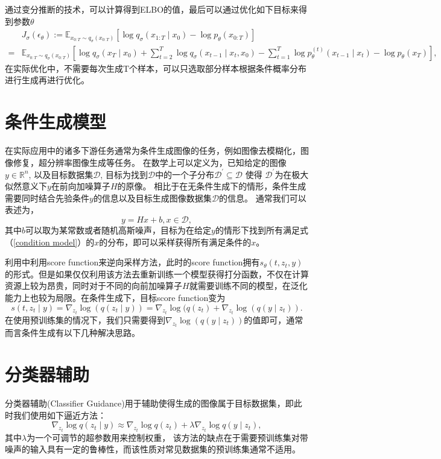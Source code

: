 通过变分推断的技术，可以计算得到ELBO的值，最后可以通过优化如下目标来得到参数$\theta$
\begin{align} & J_\sigma\left(\epsilon_\theta\right):=\mathbb{E}_{{x}_{0: T} \sim q_\sigma\left({x}_{0: T}\right)}\left[\log q_\sigma\left({x}_{1: T} \mid {x}_0\right)-\log p_\theta\left({x}_{0: T}\right)\right] \\ = & \mathbb{E}_{{x}_{0: T} \sim q_\sigma\left({x}_{0: T}\right)}\left[\log q_\sigma\left({x}_T \mid {x}_0\right)+\sum_{t=2}^T \log q_\sigma\left({x}_{t-1} \mid {x}_t, {x}_0\right)-\sum_{t=1}^T \log p_\theta^{(t)}\left({x}_{t-1} \mid {x}_t\right)-\log p_\theta\left({x}_T\right)\right],\end{align}
在实际优化中，不需要每次生成T个样本，可以只选取部分样本根据条件概率分布进行生成再进行优化。
\section{条件生成模型}
在实际应用中的诸多下游任务通常为条件生成图像的任务，例如图像去模糊化，图像修复，超分辨率图像生成等任务。 在数学上可以定义为，已知给定的图像$y\in \mathbb{R}^n$, 以及目标数据集$\mathcal{D}$, 目标为找到$\mathcal{D}$中的一个子分布$\mathcal{D}^{\prime}\subseteq \mathcal{D}$ 使得 $\mathcal{D}^{\prime}$为在极大似然意义下$y$在前向加噪算子$H$的原像。 相比于在无条件生成下的情形，条件生成需要同时结合先验条件$y$的信息以及目标生成图像数据集$\mathcal{D}$的信息。 通常我们可以表述为，
\begin{equation}
    y = Hx +b ,  x\in \mathcal{D},\label{condition model}
\end{equation}
其中$b$可以取为某常数或者随机高斯噪声，目标为在给定$y$的情形下找到所有满足式（\ref{condition model}）的$x$的分布，即可以采样获得所有满足条件的$x$。      


利用\cite{score_based_SDE,song_2}中利用score function来逆向采样方法，此时的score function拥有$s_{\theta}(t,z_t,y)$的形式。但是如果仅仅利用该方法去重新训练一个模型获得打分函数，不仅在计算资源上较为昂贵，同时对于不同的向前加噪算子$H$就需要训练不同的模型，在泛化能力上也较为局限。在条件生成下，目标score function变为
\begin{equation}
    s(t,z_t\mid y) = \nabla_{z_t}\log\left(q(z_t\mid y)\right)= \nabla_{z_t}\log(q(z_t)+\nabla_{z_t}\log \left(q(y\mid z_t)\right).
    \label{Bayes transformation}
\end{equation}
在使用预训练集的情况下，我们只需要得到$\nabla_{z_t}\log(q(y\mid z_t))$的值即可，通常而言条件生成有以下几种解决思路。

\section{分类器辅助 }
\label{classifier guidance}
分类器辅助(Classifier Guidance)用于辅助使得生成的图像属于目标数据集，即此时我们使用如下逼近方法：
\begin{equation}
    \nabla_{{z}_t} \log q\left({z}_t \mid y\right)\approx \nabla_{{z}_t} \log q\left({z}_t\right)+\lambda \nabla_{{z}_t} \log q\left(y \mid {z}_t\right),
\end{equation}
其中$\lambda$为一个可调节的超参数用来控制权重， 该方法的缺点在于需要预训练集对带噪声的输入具有一定的鲁棒性，而该性质对常见数据集的预训练集通常不适用。 


